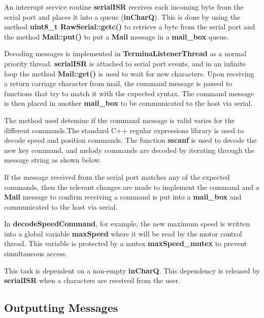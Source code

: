 \documentclass{article}
\begin{document}
\noindent
An interrupt service routine \textbf{serialISR} receives each incoming byte from the serial port and places it into a queue (\textbf{inCharQ}). This is done by using the method \textbf{uint8\_t RawSerial::getc()} to retrieve a byte from the serial port and the method \textbf{Mail::put()} to put a \textbf{Mail} message in a \textbf{mail\_box} queue.
\bigskip

\noindent
Decoding messages is implemented in \textbf{TerminaListenerThread} as a normal priority thread. \textbf{serialISR} is attached to serial port events, and in an infinite loop the method \textbf{Mail::get()} is used to wait for new characters. Upon receiving a return carriage character from mail, the command message is passed to functions that try to match it with the expected syntax. The command message is then placed in another \textbf{mail\_box} to be communicated to the host via serial.

\bigskip

\bigskip

\noindent
The method used detemine if the command message is valid varies for the different commands.The standard C++ regular expressions library is used to decode speed and position commands. The function \textbf{sscanf} is used to decode the new key command, and melody commands are decoded by iterating through the message string as shown below.

\bigskip

\bigskip
If the message received from the serial port matches any of the expected commands, then the relevant changes are made to implement the command and a \textbf{Mail} message to confirm receiving a command is put into a \textbf{mail\_box} and communicated to the host via serial.
\bigskip


\noindent
In \textbf{decodeSpeedCommand}, for example, the new maximum speed is written into a global variable \textbf{maxSpeed} where it will be read by the motor control thread. This variable is protected by a mutex \textbf{maxSpeed\_mutex} to prevent simultaneous access.

\bigskip

\noindent
This task is dependent on a non-empty \textbf{inCharQ}. This dependency is released by \textbf{serialISR} when a characters are received from the user.

\subsection{Outputting Messages}
\end{document}
